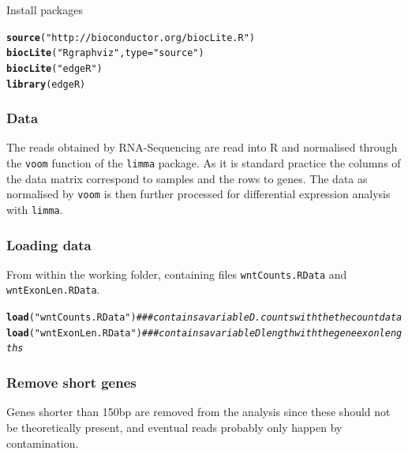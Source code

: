 \documentclass[a4paper]{article}
\makeatletter
\newcommand{\hlstr}[1]{\textcolor[rgb]{0.192,0.494,0.8}{#1}}%
\newcommand{\hlcom}[1]{\textcolor[rgb]{0.678,0.584,0.686}{\textit{#1}}}%
\newcommand{\hlstd}[1]{\textcolor[rgb]{0.345,0.345,0.345}{#1}}%
\newcommand{\hlkwc}[1]{\textcolor[rgb]{0.333,0.667,0.333}{#1}}%
\newcommand{\hlkwd}[1]{\textcolor[rgb]{0.737,0.353,0.396}{\textbf{#1}}}%
\newenvironment{kframe}{%
 \def\at@end@of@kframe{}%
 \ifinner\ifhmode%
  \def\at@end@of@kframe{\end{minipage}}%
  \begin{minipage}{\columnwidth}%
 \fi\fi%
 \def\FrameCommand##1{\hskip\@totalleftmargin \hskip-\fboxsep
 \colorbox{shadecolor}{##1}\hskip-\fboxsep
     \hskip-\linewidth \hskip-\@totalleftmargin \hskip\columnwidth}%
 \MakeFramed {\advance\hsize-\width
   \@totalleftmargin\z@ \linewidth\hsize
   \@setminipage}}%
 {\par\unskip\endMakeFramed%
 \at@end@of@kframe}
\newenvironment{knitrout}{}{} %
\makeatother
\begin{document}
Install packages
\begin{knitrout}
\color{fgcolor}\begin{kframe}
\begin{alltt}
\hlkwd{source}\hlstd{(}\hlstr{"http://bioconductor.org/biocLite.R"}\hlstd{)}
\hlkwd{biocLite}\hlstd{(}\hlstr{"Rgraphviz"}\hlstd{,} \hlkwc{type} \hlstd{=} \hlstr{"source"}\hlstd{)}
\hlkwd{biocLite}\hlstd{(}\hlstr{"edgeR"}\hlstd{)}
\hlkwd{library}\hlstd{(edgeR)}
\end{alltt}
\end{kframe}
\end{knitrout}

\subsubsection*{Data}
The reads obtained by RNA-Sequencing are read into R and normalised through the \verb'voom' function \cite{art:Smyth2014} of the \verb'limma' package. As it is standard practice the columns of the data matrix correspond to samples and the rows to genes. The data as normalised by \verb'voom' is then further processed for differential expression analysis with \verb'limma'.

\subsubsection*{Loading data}
From within the working folder, containing files \verb'wntCounts.RData' and \verb'wntExonLen.RData'.

\begin{knitrout}
\color{fgcolor}\begin{kframe}
\begin{alltt}
\hlkwd{load}\hlstd{(}\hlstr{"wntCounts.RData"}\hlstd{)}  \hlcom{### contains a variable D.counts with the the count data}
\hlkwd{load}\hlstd{(}\hlstr{"wntExonLen.RData"}\hlstd{)}  \hlcom{### contains a variable Dlength with the gene exon lengths}
\end{alltt}
\end{kframe}
\end{knitrout}

\subsubsection*{Remove short genes}
Genes shorter than 150bp are removed from the analysis since these should not be theoretically present, and eventual reads probably only happen by contamination.
\end{document}
